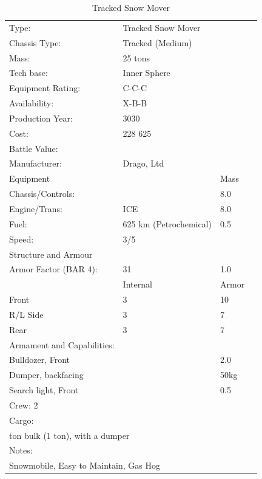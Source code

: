 \documentclass{tufte-book}
\begin{document}
\bigskip
\begin{table}
  \begin{minipage}{\textwidth}
    \begin{center}
      \begin{tabular}{llll}
        \toprule
        Type: & Tracked Snow Mover & \\
        Chassis Type: & Tracked (Medium) & \\
        Mass: & 25 tons & \\
        Tech base: & Inner Sphere & \\
        Equipment Rating: & C-C-C & \\
        Availability: & X-B-B & \\
        Production Year: & 3030 & \\
        Cost: & 228 625 & \\
        Battle Value: & & \\
        Manufacturer: & Drago, Ltd & \\
        Equipment & & Mass \\
        \quad Chassis/Controls: & & 8.0 \\
        \quad Engine/Trans: & ICE & 8.0 \\
        \quad Fuel: & 625 km (Petrochemical) & 0.5 \\
        \quad Speed: & \multicolumn{2}{l}{3/5} \\
        Structure and Armour & & \\
        \quad Armor Factor (BAR 4): & 31 & 1.0 \\
        \quad & Internal & Armor \\
        \quad Front & 3 & 10 \\
        \quad R/L Side & 3 & 7 \\
        \quad Rear & 3 & 7 \\

        Armament and Capabilities: & & \\
        \multicolumn{2}{l}{\quad Bulldozer, Front} & 2.0 \\
        \multicolumn{2}{l}{\quad Dumper, backfacing} & 50kg \\
        \multicolumn{2}{l}{\quad Search light, Front} & 0.5 \\

        \multicolumn{3}{l}{Crew: 2} \\
        Cargo: & & \\
        \multicolumn{3}{l}{\quad 1 ton bulk (1 ton), with a dumper} \\

        Notes: & & \\
        \multicolumn{3}{l}{\quad Snowmobile, Easy to Maintain, Gas Hog} \\

        \bottomrule
      \end{tabular}
    \end{center}
  \end{minipage}
  \caption{Tracked Snow Mover}
\end{table}
\end{document}
